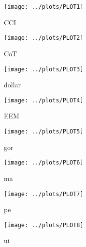 \documentclass[a4paper,12pt]{article}
\begin{document}
\begin{figure}[!htb]
\centering
\texttt{[image: ../plots/PLOT1]}
\caption{CCI}
\label{fig:cci}
\end{figure}

\begin{figure}[!htb]
\centering
\texttt{[image: ../plots/PLOT2]}
\caption{CoT}
\label{fig:cot}
\end{figure}

\begin{figure}[!htb]
\centering
\texttt{[image: ../plots/PLOT3]}
\caption{dollar}
\label{fig:dollar}
\end{figure}

\begin{figure}[!htb]
\centering
\texttt{[image: ../plots/PLOT4]}
\caption{EEM}
\label{fig:eem}
\end{figure}

\begin{figure}[!htb]
\centering
\texttt{[image: ../plots/PLOT5]}
\caption{gor}
\label{fig:gor}
\end{figure}

\begin{figure}[!htb]
\centering
\texttt{[image: ../plots/PLOT6]}
\caption{ma}
\label{fig:ma}
\end{figure}

\begin{figure}[!htb]
\centering
\texttt{[image: ../plots/PLOT7]}
\caption{pe}
\label{fig:pe}
\end{figure}

\begin{figure}[!htb]
\centering
\texttt{[image: ../plots/PLOT8]}
\caption{ui}
\label{fig:ui}
\end{figure}
\end{document}

